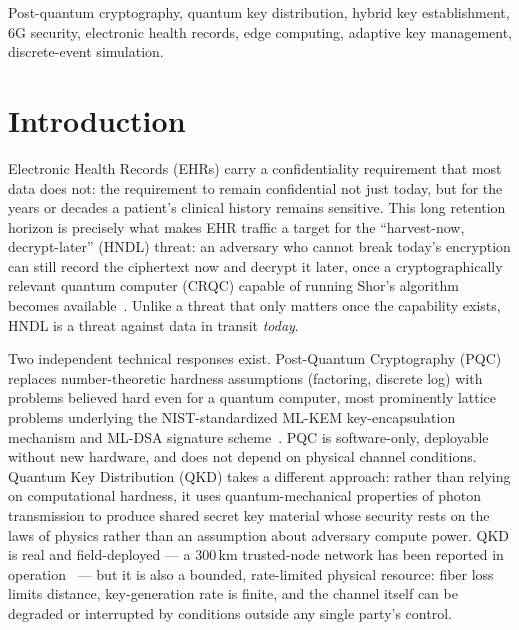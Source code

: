 \documentclass[journal]{IEEEtran}
\begin{document}
\begin{IEEEkeywords}
Post-quantum cryptography, quantum key distribution, hybrid key establishment, 6G security, electronic health records, edge computing, adaptive key management, discrete-event simulation.
\end{IEEEkeywords}

\section{Introduction}
\label{sec:intro}

Electronic Health Records (EHRs) carry a confidentiality requirement that most data does not: the requirement to remain confidential not just today, but for the years or decades a patient's clinical history remains sensitive. This long retention horizon is precisely what makes EHR traffic a target for the ``harvest-now, decrypt-later'' (HNDL) threat: an adversary who cannot break today's encryption can still record the ciphertext now and decrypt it later, once a cryptographically relevant quantum computer (CRQC) capable of running Shor's algorithm becomes available~\cite{nist2024fips203}. Unlike a threat that only matters once the capability exists, HNDL is a threat against data in transit \emph{today}.

Two independent technical responses exist. Post-Quantum Cryptography (PQC) replaces number-theoretic hardness assumptions (factoring, discrete log) with problems believed hard even for a quantum computer, most prominently lattice problems underlying the NIST-standardized ML-KEM key-encapsulation mechanism and ML-DSA signature scheme~\cite{nist2024fips203,nist2024fips204}. PQC is software-only, deployable without new hardware, and does not depend on physical channel conditions. Quantum Key Distribution (QKD) takes a different approach: rather than relying on computational hardness, it uses quantum-mechanical properties of photon transmission to produce shared secret key material whose security rests on the laws of physics rather than an assumption about adversary compute power. QKD is real and field-deployed --- a 300\,km trusted-node network has been reported in operation~\cite{clason2026deployed} --- but it is also a bounded, rate-limited physical resource: fiber loss limits distance, key-generation rate is finite, and the channel itself can be degraded or interrupted by conditions outside any single party's control.
\end{document}
